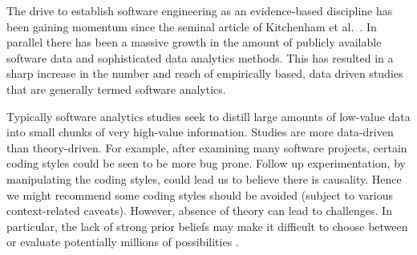 \documentclass[preprint,10pt]{elsarticle}
\newcommand{\RED}{\color{red}}
\newcommand{\BLACK}{\color{black}}
\begin{document}
\noindent
The drive to establish software engineering as an evidence-based discipline has been gaining momentum since the seminal article of Kitchenham et al.~\cite{Kitc04}.  In parallel there has been a massive growth in the amount of publicly available software data and sophisticated data analytics methods.  This has resulted in a sharp increase in the number and reach of empirically based, data driven studies that are generally termed software analytics.

Typically software analytics studies seek to distill large amounts of low-value data into small chunks of very high-value information. Studies are more data-driven than theory-driven.  For example, after examining many software projects, certain coding styles could be seen to be more bug prone.  Follow up experimentation, by manipulating the coding styles, could lead us to believe there is causality. Hence we might recommend some coding styles should be avoided (subject to various context-related caveats). \RED However, absence of theory can lead to challenges.  In particular, the lack of strong prior beliefs may make it difficult to choose between or evaluate potentially millions of possibilities \cite{Gust93,Deva16}.  \BLACK



\end{document}
